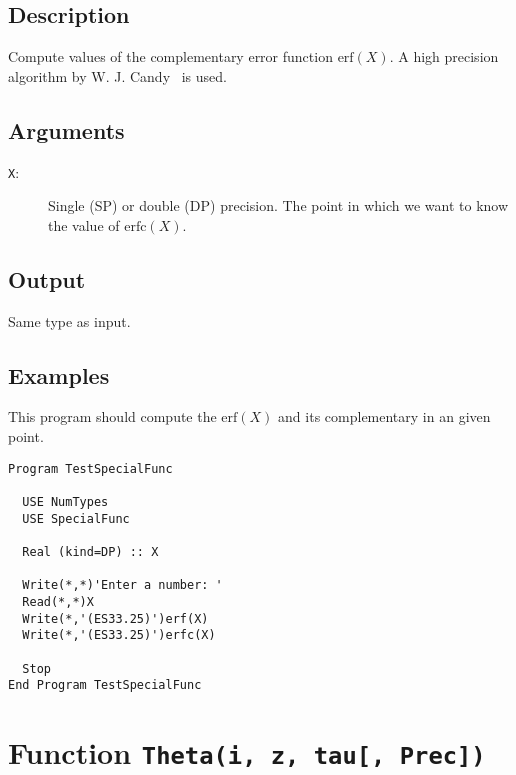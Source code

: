 \subsection{Description}

Compute values of the complementary error function $\text{erf}(X)$. A high
precision algorithm by W. J. Candy~\cite{cody:1969aa} is used.

\subsection{Arguments}

\begin{description}
\item[\texttt{X}:] Single (SP) or double (DP) precision. The point in
  which we want to know the value of $\text{erfc}(X)$.
\end{description}

\subsection{Output}

Same type as input.

\subsection{Examples}

This program should compute the $\text{erf}(X)$ and its complementary
in an given point.

\begin{lstlisting}[emph=erfc,
                   emphstyle=\color{blue},
                   frame=trBL,
                   caption=Computing the complementary Error Function.,
                   label=erfc]
Program TestSpecialFunc

  USE NumTypes
  USE SpecialFunc

  Real (kind=DP) :: X

  Write(*,*)'Enter a number: '
  Read(*,*)X
  Write(*,'(ES33.25)')erf(X)
  Write(*,'(ES33.25)')erfc(X)

  Stop
End Program TestSpecialFunc
\end{lstlisting}

\section{Function \texttt{Theta(i, z, tau[, Prec])}}

